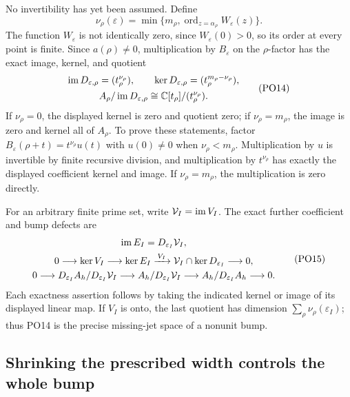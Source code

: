 No invertibility has yet been assumed. Define
\[
 \nu_\rho(\varepsilon)=
    \min\{m_\rho,\operatorname{ord}_{z=\alpha_\rho}W_\varepsilon(z)\}.
 \tag{PO13}\label{PO:po:vanishing}
\]
The function \(W_\varepsilon\) is not identically zero, since
\(W_\varepsilon(0)>0\), so its order at every point is finite.
Since \(a(\rho)\ne0\), multiplication by \(B_\varepsilon\) on the
\(\rho\)-factor has the exact image, kernel, and quotient
\[
 \begin{gathered}
 \operatorname{im} D_{\varepsilon,\rho}=(t_\rho^{\nu_\rho}),\qquad
 \ker D_{\varepsilon,\rho}=(t_\rho^{m_\rho-\nu_\rho}),\\
 A_\rho/\operatorname{im} D_{\varepsilon,\rho}\cong\mathbb C[t_\rho]/(t_\rho^{\nu_\rho}).
 \end{gathered}
 \tag{PO14}\label{PO:po:nonunit}
\]
If \(\nu_\rho=0\), the displayed kernel is zero and quotient
zero; if \(\nu_\rho=m_\rho\), the image is zero and kernel all
of \(A_\rho\). To prove these statements, factor
\(B_\varepsilon(\rho+t)=t^{\nu_\rho}u(t)\) with \(u(0)\ne0\)
when \(\nu_\rho<m_\rho\). Multiplication by \(u\) is invertible
by finite recursive division, and multiplication by \(t^{\nu_\rho}\)
has exactly the displayed coefficient kernel and image.
If \(\nu_\rho=m_\rho\), the multiplication is zero directly.

For an arbitrary finite prime set, write \(\mathcal V_I=\operatorname{im} V_I\).
The exact further coefficient and bump defects are
\[
 \begin{gathered}
 \operatorname{im} E_I=D_{\varepsilon_I}\mathcal V_I,\\
 0\longrightarrow\ker V_I\longrightarrow\ker E_I
     \xrightarrow{\,V_I\,}\mathcal V_I\cap\ker D_{\varepsilon_I}
       \longrightarrow0,\\
 0\longrightarrow D_{\varepsilon_I}A_h/D_{\varepsilon_I}\mathcal V_I
   \longrightarrow A_h/D_{\varepsilon_I}\mathcal V_I
   \longrightarrow A_h/D_{\varepsilon_I}A_h\longrightarrow0 .
 \end{gathered}
 \tag{PO15}\label{PO:po:defects}
\]
Each exactness assertion follows by taking the indicated kernel
or image of its displayed linear map. If \(V_I\) is onto,
the last quotient has dimension \(\sum_\rho\nu_\rho(\varepsilon_I)\);
thus PO14 is the precise missing-jet space of a nonunit bump.

\subsection{Shrinking the prescribed width controls the whole bump}

